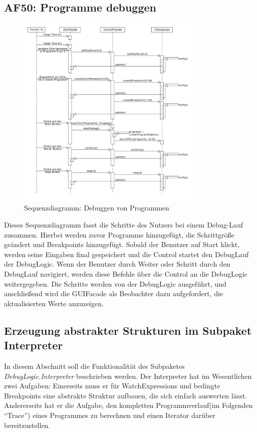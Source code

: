 \documentclass[parskip=full]{scrartcl}
\begin{document}
\subsection{AF50: Programme debuggen}
\begin{figure}[!h]
\centering
\includegraphics[width=0.8\textwidth]{diagrammIdeenUmlet/SequenceDiagrams/seq_AF50PDF.pdf}
\caption{Sequenzdiagramm: Debuggen von Programmen}
\end{figure}
Dieses Sequenzdiagramm fasst die Schritte des Nutzers bei einem Debug-Lauf zusammen.
Hierbei werden zuvor Programme hinzugefügt, die Schrittgröße geändert und Breakpoints hinzugefügt.
Sobald der Benutzer auf Start klickt, werden seine Eingaben final gespeichert und die Control startet 
den DebugLauf der DebugLogic.
Wenn der Benutzer durch Weiter oder Schritt durch den DebugLauf navigiert, werden diese Befehle über
die Control an die DebugLogic weitergegeben. Die Schritte werden von der DebugLogic ausgeführt, und anschließend
wird die GUIFacade als Beobachter dazu aufgefordert, die aktualisierten Werte anzuzeigen.
\subsection{Erzeugung abstrakter Strukturen im Subpaket Interpreter}
In diesem Abschnitt soll die Funktionalität des Subpaketes \textit{DebugLogic.Interpreter} beschrieben werden. Der Interpreter hat im Wesentlichen zwei Aufgaben: Einerseits muss er für WatchExpressions und bedingte Breakpoints eine abstrakte Struktur aufbauen, die sich einfach auswerten lässt. Andererseits hat er die Aufgabe, den kompletten Programmverlauf(im Folgenden \enquote{Trace})  eines Programmes zu berechnen und einen Iterator darüber bereitzustellen.
\end{document}
